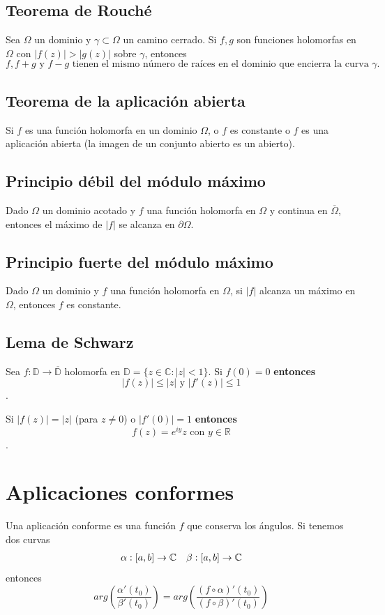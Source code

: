 \documentclass[paper=a4, fontsize=11pt]{scrartcl}
\numberwithin{equation}{section}
\numberwithin{figure}{section}
\numberwithin{table}{section}
\begin{document}
\subsection{Teorema de Rouché}
Sea $\Omega$ un dominio y $\gamma\subset\Omega$ un camino cerrado. Si $f,g$ son funciones holomorfas en $\Omega$ con $|f(z)|>|g(z)|$ sobre $\gamma$, entonces
$$f, f+g \text{ y } f-g \text{ tienen el mismo número de raíces en el dominio que encierra la curva } \gamma.$$

\subsection{Teorema de la aplicación abierta}
Si $f$ es una función holomorfa en un dominio $\Omega$, o $f$ es constante o $f$ es una aplicación abierta (la imagen de un conjunto abierto es un abierto).

\subsection{Principio débil del módulo máximo}
Dado $\Omega$ un dominio acotado y $f$ una función holomorfa en $\Omega$ y continua en $\overline{\Omega}$, entonces el máximo de $|f|$ se alcanza en $\partial\Omega$.

\subsection{Principio fuerte del módulo máximo}
Dado $\Omega$ un dominio y $f$ una función holomorfa en $\Omega$, si $|f|$ alcanza un máximo en $\Omega$, entonces $f$ es constante.

\subsection{Lema de Schwarz}
Sea $f:\mathbb{D}\to\overline{\mathbb{D}}$ holomorfa en $\mathbb{D}=\{z\in\mathbb{C}: |z|<1\}$. Si $\boxed{f(0) = 0}$ \textbf{entonces} $$\boxed{|f(z)|\le|z|}\text{ y }\boxed{|f'(z)| \le 1}$$.

Si $\boxed{|f(z)|=|z|}$ (para $z\neq 0$) o $\boxed{|f'(0)| = 1}$ \textbf{entonces} $$\boxed{f(z) = e^{iy}z}\text{ con }y\in\mathbb{R}$$.

\newpage
\section{Aplicaciones conformes}
Una aplicación conforme es una función $f$ que conserva los ángulos. Si tenemos dos curvas
$$
\begin{array}{l l}
\alpha:[a,b]\to\mathbb{C} & \beta:[a,b]\to\mathbb{C}
\end{array}
$$
entonces
$$arg\left(\frac{\alpha'(t_0)}{\beta'(t_0)}\right) = arg\left(\frac{\left(f\circ \alpha \right)'(t_0)}{\left(f\circ \beta \right)'(t_0)}\right)$$
\end{document}
